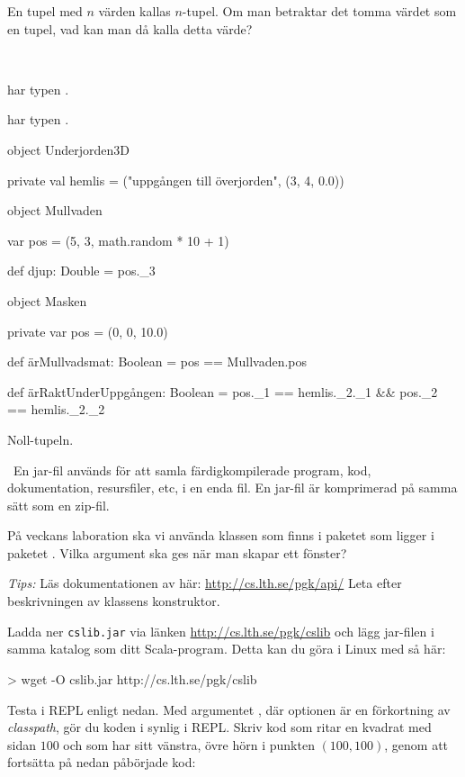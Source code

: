 \Subtask En tupel med $n$ värden kallas $n$-tupel. Om man betraktar det tomma värdet  \code{()} som en tupel, vad kan man då kalla detta värde?

\SOLUTION

\TaskSolved \what~

\SubtaskSolved {} har typen .

\SubtaskSolved {} har typen .


\SubtaskSolved
\begin{Code}
object Underjorden3D {
  private val hemlis = ("uppgången till överjorden", (3, 4, 0.0))

  object Mullvaden {
    var pos = (5, 3, math.random * 10 + 1)

    def djup: Double  = pos._3
  }

  object Masken {
    private var pos = (0, 0, 10.0)

    def ärMullvadsmat: Boolean = pos == Mullvaden.pos

    def ärRaktUnderUppgången: Boolean =
      pos._1 == hemlis._2._1 && pos._2 == hemlis._2._2
  }
}
\end{Code}

\SubtaskSolved Noll-tupeln.

\QUESTEND



\QUESTBEGIN

\Task \what~En jar-fil används för att samla färdigkompilerade program, kod, dokumentation, resursfiler, etc, i en enda fil. En jar-fil är komprimerad på samma sätt som en zip-fil.

\Subtask På veckans laboration ska vi använda klassen  som finns i paketet  som ligger i paketet . Vilka argument ska ges när man skapar ett fönster?

\emph{Tips:}  Läs dokumentationen av  här:  \url{http://cs.lth.se/pgk/api/}
 Leta efter beskrivningen av klassens konstruktor.

\Subtask Ladda ner \texttt{cslib.jar} via länken \url{http://cs.lth.se/pgk/cslib} och lägg jar-filen i samma katalog som ditt Scala-program. Detta kan du göra i Linux med  så här:

\begin{REPLnonum}
> wget -O cslib.jar http://cs.lth.se/pgk/cslib
\end{REPLnonum}

\Subtask Testa  i REPL enligt nedan. Med argumentet , där optionen  är en förkortning av \emph{classpath}, gör du koden i  synlig i REPL.  Skriv kod som ritar en kvadrat med sidan $100$ och som har sitt vänstra, övre hörn i punkten $(100,100)$, genom att fortsätta på nedan påbörjade kod:

